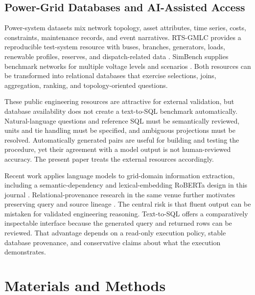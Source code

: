 \documentclass[applsci,article,submit,moreauthors]{Definitions/mdpi}
\begin{document}
\subsection{Power-Grid Databases and AI-Assisted Access}
Power-system datasets mix network topology, asset attributes, time series, costs, constraints, maintenance records, and event narratives. RTS-GMLC provides a reproducible test-system resource with buses, branches, generators, loads, renewable profiles, reserves, and dispatch-related data \cite{barrows2020rts}. SimBench supplies benchmark networks for multiple voltage levels and scenarios \cite{meinecke2020simbench}. Both resources can be transformed into relational databases that exercise selections, joins, aggregation, ranking, and topology-oriented questions.

These public engineering resources are attractive for external validation, but database availability does not create a text-to-SQL benchmark automatically. Natural-language questions and reference SQL must be semantically reviewed, units and tie handling must be specified, and ambiguous projections must be resolved. Automatically generated pairs are useful for building and testing the procedure, yet their agreement with a model output is not human-reviewed accuracy. The present paper treats the external resources accordingly.

Recent work applies language models to grid-domain information extraction, including a semantic-dependency and lexical-embedding RoBERTa design in this journal \cite{meng2023gridroberta}. Relational-provenance research in the same venue further motivates preserving query and source lineage \cite{tang2023provenance}. The central risk is that fluent output can be mistaken for validated engineering reasoning. Text-to-SQL offers a comparatively inspectable interface because the generated query and returned rows can be reviewed. That advantage depends on a read-only execution policy, stable database provenance, and conservative claims about what the execution demonstrates.

\section{Materials and Methods}
\end{document}
